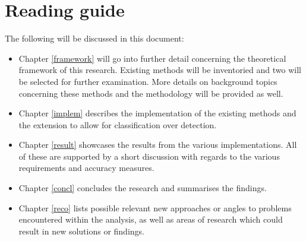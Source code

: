 \section{Reading guide}
The following will be discussed in this document:

\begin{itemize}
	\item Chapter \ref{framework} will go into further detail concerning the theoretical framework of this research. Existing methods will be inventoried and two will be selected for further examination. More details on background topics concerning these methods and the methodology will be provided as well.
	\item Chapter \ref{implem} describes the implementation of the existing methods and the extension to allow for classification over detection.
	\item Chapter \ref{result} showcases the results from the various implementations. All of these are supported by a short discussion with regards to the various requirements and accuracy measures.
	\item Chapter \ref{concl} concludes the research and summarises the findings.
	\item Chapter \ref{reco} lists possible relevant new approaches or angles to problems encountered within the analysis, as well as areas of research which could result in new solutions or findings.
\end{itemize}


